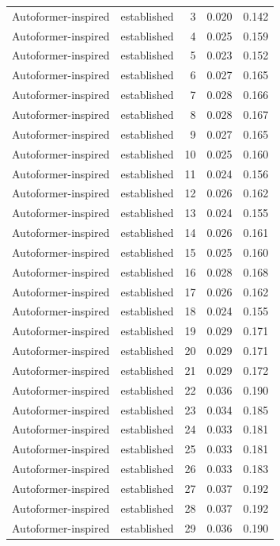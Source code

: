 \begin{tabular}{llrrr}
Autoformer-inspired & established & 3 & 0.020 & 0.142 \\
Autoformer-inspired & established & 4 & 0.025 & 0.159 \\
Autoformer-inspired & established & 5 & 0.023 & 0.152 \\
Autoformer-inspired & established & 6 & 0.027 & 0.165 \\
Autoformer-inspired & established & 7 & 0.028 & 0.166 \\
Autoformer-inspired & established & 8 & 0.028 & 0.167 \\
Autoformer-inspired & established & 9 & 0.027 & 0.165 \\
Autoformer-inspired & established & 10 & 0.025 & 0.160 \\
Autoformer-inspired & established & 11 & 0.024 & 0.156 \\
Autoformer-inspired & established & 12 & 0.026 & 0.162 \\
Autoformer-inspired & established & 13 & 0.024 & 0.155 \\
Autoformer-inspired & established & 14 & 0.026 & 0.161 \\
Autoformer-inspired & established & 15 & 0.025 & 0.160 \\
Autoformer-inspired & established & 16 & 0.028 & 0.168 \\
Autoformer-inspired & established & 17 & 0.026 & 0.162 \\
Autoformer-inspired & established & 18 & 0.024 & 0.155 \\
Autoformer-inspired & established & 19 & 0.029 & 0.171 \\
Autoformer-inspired & established & 20 & 0.029 & 0.171 \\
Autoformer-inspired & established & 21 & 0.029 & 0.172 \\
Autoformer-inspired & established & 22 & 0.036 & 0.190 \\
Autoformer-inspired & established & 23 & 0.034 & 0.185 \\
Autoformer-inspired & established & 24 & 0.033 & 0.181 \\
Autoformer-inspired & established & 25 & 0.033 & 0.181 \\
Autoformer-inspired & established & 26 & 0.033 & 0.183 \\
Autoformer-inspired & established & 27 & 0.037 & 0.192 \\
Autoformer-inspired & established & 28 & 0.037 & 0.192 \\
Autoformer-inspired & established & 29 & 0.036 & 0.190 \\

\end{tabular}

